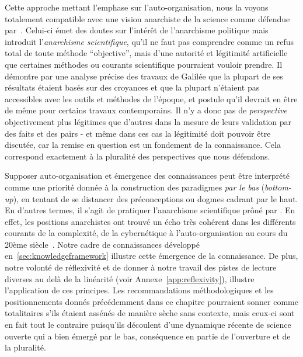 Cette approche mettant l'emphase sur l'auto-organisation, nous la voyons totalement compatible avec une vision anarchiste de la science comme défendue par~\cite{feyerabend1993against}. Celui-ci émet des doutes sur l'intérêt de l'anarchisme politique mais introduit l'\emph{anarchisme scientifique}, qu'il ne faut pas comprendre comme un refus total de toute méthode ``objective'', mais d'une autorité et légitimité artificielle que certaines méthodes ou courants scientifique pourraient vouloir prendre. Il démontre par une analyse précise des travaux de Galilée que la plupart de ses résultats étaient basés sur des croyances et que la plupart n'étaient pas accessibles avec les outils et méthodes de l'époque, et postule qu'il devrait en être de même pour certains travaux contemporains. Il n'y a donc pas de \emph{perspective} objectivement plus légitimes que d'autres dans la mesure de leurs validation par des faits et des pairs - et même dans ces cas la légitimité doit pouvoir être discutée, car la remise en question est un fondement de la connaissance. Cela correspond exactement à la pluralité des perspectives que nous défendons.


Supposer auto-organisation et émergence des connaissances peut être interprété comme une priorité donnée à la construction des paradigmes \emph{par le bas} (\emph{bottom-up}), en tentant de se distancer des préconceptions ou dogmes cadrant par le haut. En d'autres termes, il s'agit de pratiquer l'anarchisme scientifique prôné par . En effet, les positions anarchistes ont trouvé un écho très cohérent dans les différents courants de la complexité, de la cybernétique à l'auto-organisation au cours du 20ème siècle~\cite{duda2013cybernetics}. Notre cadre de connaissances développé en~\ref{sec:knowledgeframework} illustre cette émergence de la connaissance. De plus, notre volonté de réflexivité et de donner à notre travail des pistes de lecture diverses au delà de la linéarité (voir Annexe~\ref{app:reflexivity}), illustre l'application de ces principes. Les recommandations méthodologiques et les positionnements donnés précédemment dans ce chapitre pourraient sonner comme totalitaires s'ils étaient assénés de manière sèche sans contexte, mais ceux-ci sont en fait tout le contraire puisqu'ils découlent d'une dynamique récente de science ouverte qui a bien émergé par le bas, conséquence en partie de l'ouverture et de la pluralité.







